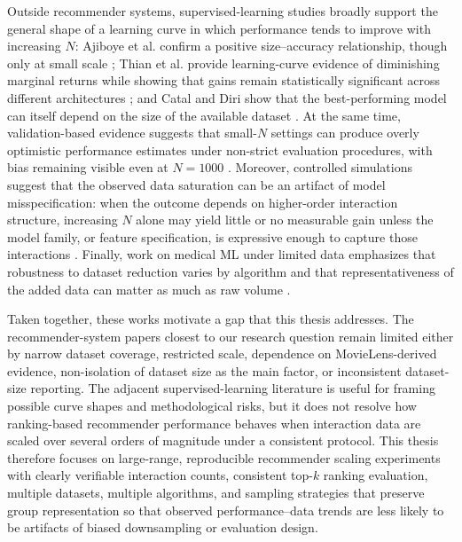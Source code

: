 \documentclass[12pt,a4paper]{article}
\begin{document}
Outside recommender systems, supervised-learning studies broadly support the general shape of a learning curve in which performance tends to improve with increasing $N$: Ajiboye et al. confirm a positive size--accuracy relationship, though only at small scale \cite{ajiboye2015}; Thian et al. provide learning-curve evidence of diminishing marginal returns while showing that gains remain statistically significant across different architectures \cite{thian2022}; and Catal and Diri show that the best-performing model can itself depend on the size of the available dataset \cite{catal2009}. At the same time, validation-based evidence suggests that small-$N$ settings can produce overly optimistic performance estimates under non-strict evaluation procedures, with bias remaining visible even at $N=1000$ \cite{vabalas2019}. Moreover, controlled simulations suggest that the observed data saturation can be an artifact of model misspecification: when the outcome depends on higher-order interaction structure, increasing $N$ alone may yield little or no measurable gain unless the model family, or feature specification, is expressive enough to capture those interactions \cite{bailly2022}. Finally, work on medical ML under limited data emphasizes that robustness to dataset reduction varies by algorithm and that representativeness of the added data can matter as much as raw volume \cite{althnian2021}.

Taken together, these works motivate a gap that this thesis addresses. The recommender-system papers closest to our research question remain limited either by narrow dataset coverage, restricted scale, dependence on MovieLens-derived evidence, non-isolation of dataset size as the main factor, or inconsistent dataset-size reporting. The adjacent supervised-learning literature is useful for framing possible curve shapes and methodological risks, but it does not resolve how ranking-based recommender performance behaves when interaction data are scaled over several orders of magnitude under a consistent protocol. This thesis therefore focuses on large-range, reproducible recommender scaling experiments with clearly verifiable interaction counts, consistent top-$k$ ranking evaluation, multiple datasets, multiple algorithms, and sampling strategies that preserve group representation so that observed performance--data trends are less likely to be artifacts of biased downsampling or evaluation design.
\end{document}
